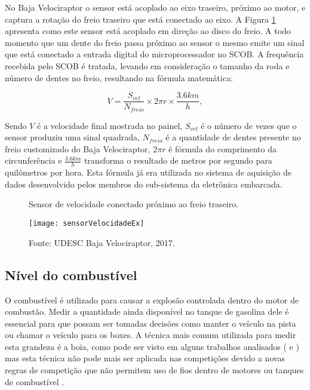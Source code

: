 No Baja Velociraptor o sensor está acoplado ao eixo traseiro, próximo ao motor, e captura a rotação do freio traseiro que está conectado ao eixo. A Figura \ref{fig:sensorVelocidadeEx} apresenta como este sensor está acoplado em direção ao disco do freio. A todo momento que um dente do freio passa próximo ao sensor o mesmo emite um sinal que está conectado a entrada digital do microprocessador no SCOB. A frequência recebida pelo SCOB é tratada, levando em consideração o tamanho da roda e número de dentes no freio, resultando na fórmula matemática:

	$$V = \frac{S_{vel}}{N_{freio}} \times 2 \pi r  \times \frac{3.6km}{h},$$  

Sendo $V$ é a velocidade final mostrada no painel, $S_{vel}$ é o número de vezes que o sensor produziu uma sinal quadrada, $N_{freio}$ é a quantidade de dentes presente no freio customizado do Baja Velociraptor, $2 \pi r$ é fórmula do comprimento da circunferência e $\frac{3.6km}{h}$ transforma o resultado de metros por segundo para quilômetros por hora. Esta fórmula já era utilizada no sistema de aquisição de dados desenvolvido pelos membros do sub-sistema da eletrônica embarcada.

\begin{figure}[!htb]
	\centering
		\caption{Sensor de velocidade conectado próximo ao freio traseiro.}
		\texttt{[image: sensorVelocidadeEx]} 
		\caption*{Fonte: UDESC Baja Velociraptor, 2017.}
		\label{fig:sensorVelocidadeEx}
\end{figure} 


\subsection{Nível do combustível}
\label{subsec:combustivel}

O combustível é utilizado para causar a explosão controlada dentro do motor de combustão. Medir a quantidade ainda disponível no tanque de gasolina dele é essencial para que possam ser tomadas decisões como manter o veículo na pista ou chamar o veículo para os boxes. A técnica mais comum utilizada para medir esta grandeza é a boia, como pode ser visto em alguns trabalhos analisados (\cite{Nunes2016} e \cite{projetoMiniBaja2006}) mas esta técnica não pode mais ser aplicada nas competições devido a novas regras de competição que não permitem uso de fios dentro de motores ou tanques de combustível \cite{regulamentobajasae}. 

